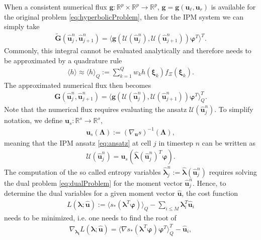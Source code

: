 When a consistent numerical flux $\bm g:\mathbb{R}^p\times\mathbb{R}^p\to\mathbb{R}^p$, $\bm g = \bm g(\bm u_\ell, \bm u_r)$ is available for the original problem \eqref{eq:hyperbolicProblem}, then for the IPM system we can simply take
\begin{align*}
 \bm{\tilde G}(\bm{\hat u}_{j}^n,\bm{\hat u}_{j+1}^{n}) = \langle \bm g(\mathcal{U}(\bm{\hat u}_j^n),\mathcal{U}(\bm{\hat u}_{j+1}^n))\bm{\varphi}^T\rangle^T.
\end{align*}
Commonly, this integral cannot be evaluated analytically and therefore needs to be approximated by a quadrature rule
\begin{align*}
\langle h \rangle \approx \langle h \rangle_{Q} := \sum_{k=1}^Q w_k h(\bm{\xi}_k)f_{\Xi}(\bm{\xi}_k).
\end{align*}
The approximated numerical flux then becomes
\begin{align}\label{eq:numericalFluxIPM}
 \bm{G}(\bm{\hat u}_{j}^n,\bm{\hat u}_{j+1}^{n}) = \langle \bm g(\mathcal{U}(\bm{\hat u}_j^n),\mathcal{U}(\bm{\hat u}_{j+1}^n))\bm{\varphi}^T\rangle^T_Q.
\end{align}
Note that the numerical flux requires evaluating the ansatz $\mathcal{U}(\bm{\hat u}_j^n)$. To simplify notation, we define $\bm{u}_{s}:\mathbb{R}^s \to \mathbb{R}^s$,
\begin{align*}
\bm{u}_{s}(\bm\Lambda):=\left( \nabla_{\bm{u}} s \right)^{-1}(\bm\Lambda),
\end{align*}
meaning that the IPM ansatz \eqref{eq:ansatz} at cell $j$ in timestep $n$ can be written as
\begin{align*}
\mathcal{U}(\bm{\hat u}_j^n) = \bm{u}_{s}(\bm{\hat{\lambda}}(\bm{\hat u}_j^n)^T \bm{\varphi}).
\end{align*}
The computation of the so called entropy variables $\bm{\hat\lambda}_j^n:=\bm{\hat\lambda}(\bm{\hat u}_j^n)$ requires solving the dual problem \eqref{eq:dualProblem} for the moment vector $\bm{\hat u}_{j}^{n}$. Hence, to determine the dual variables for a given moment vector $\bm{\hat{u}}$, the cost function
\begin{align*}
L(\bm{\lambda};\bm{\hat{u}}) := \langle s_*(\bm{\lambda}^T \bm\varphi)\rangle_Q - \sum_{i\leq M}\bm{\lambda}_i^T \bm{\hat u}_i
\end{align*}
needs to be minimized, i.e. one needs to find the root of
\begin{align*}
\nabla_{\bm{\lambda_i}}L(\bm{\lambda};\bm{\hat{u}}) = \langle \nabla s_*(\bm{\lambda}^T \bm\varphi)\bm\varphi^T\rangle_Q^T - \bm{\hat u}_i,
\end{align*}
